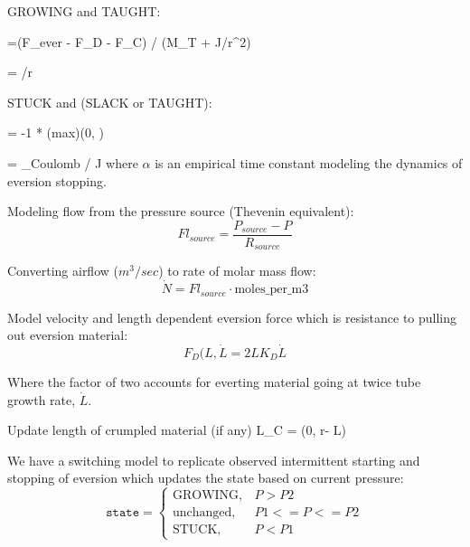 \documentclass[letterpaper]{article}
\begin{document}
GROWING and TAUGHT:

\beq
{} =(F_{ever} - F_D - F_C) /  (M_T + J/r^2)
\eeq

\beq
\ddot{\theta} = /r
\eeq

STUCK and (SLACK or TAUGHT):



\beq
{} = -1 * \mathrm(max)(0, \alpha * )
\eeq

\beq
\ddot{\theta} = \tau_{Coulomb} / J
\eeq
where $\alpha$ is an empirical time constant modeling the dynamics of eversion stopping.

Modeling flow from the pressure source (Thevenin equivalent):
\begin{equation}\label{eqOneCompartmentflow}
Fl_{source} = \frac {P_{source}-P} {R_{source}}
\end{equation}

Converting airflow ($m^3/sec$) to rate of molar mass flow:
\begin{equation}
\dot{N} = Fl_{source} \cdot \mathrm{moles\_per\_m3}
\end{equation}

Model velocity and length dependent eversion force which is resistance to pulling out eversion material:
\begin{equation}
F_D(L,\dot{L} = 2 L  K_D  \dot{L}
\end{equation}

Where the factor of two accounts for everting material going at twice tube growth rate, $\dot{L}$.

Update length of  crumpled material (if any)
\beq
L_C = (0,  r\theta - L)
\eeq

We have a switching model to replicate observed intermittent starting and stopping of eversion
which updates the state based on current pressure:
\begin{equation}
    \mathtt{state} =
    \begin{cases}
      \mathrm{GROWING}, &  P > P2 \\
      \mathrm{unchanged}, & P1 <= P <= P2 \\
      \mathrm{STUCK},   &  P < P1
    \end{cases}
\end{equation}
\end{document}
